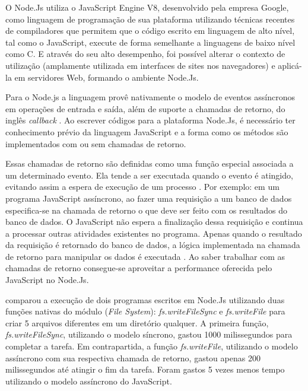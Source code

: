   O Node.Js utiliza o JavaScript Engine V8, desenvolvido pela empresa Google, como linguagem de programação
  de sua plataforma utilizando técnicas recentes de compiladores que permitem que o código escrito em linguagem de alto nível,
  tal como o JavaScript, execute de forma semelhante a linguagens de baixo nível como C.  E através do seu alto desempenho, 
  foi possível alterar o contexto de utilização (amplamente utilizada em interfaces de sites nos navegadores) e aplicá-la em 
  servidores Web, formando o ambiente Node.Js.
  
  
  Para o Node.js a linguagem provê nativamente o modelo de eventos assíncronos em operações de entrada e saída, 
  além de suporte a chamadas de retorno, do inglês \textit{callback} \cite{oliveira}.  Ao escrever códigos para a 
  plataforma Node.Js, é necessário ter conhecimento prévio da linguagem JavaScript e a forma como os 
  métodos são implementados com ou sem chamadas de retorno. \cite{hughes}
  
  
  
 

  Essas chamadas de retorno são definidas como uma função especial associada a um determinado evento. Ela tende a ser 
  executada quando o evento é atingido, evitando assim a espera de execução de um processo \cite{wilson}. Por exemplo:
  em um programa JavaScript assíncrono, ao fazer uma requisição a um banco de dados especifica-se na chamada de retorno o 
  que deve ser feito com os resultados do banco de dados. O JavaScript
  não espera a finalização dessa requisição e continua a processar outras atividades existentes no programa. 
  Apenas quando o resultado da requisição é retornado do banco de dados, a lógica implementada na chamada de retorno 
  para manipular os dados é executada \cite{junior}. Ao saber trabalhar com as chamadas de retorno consegue-se aproveitar 
  a performance oferecida pelo JavaScript no Node.Js.
  
   comparou a execução de dois programas escritos em Node.Js utilizando duas funções nativas
  do módulo (\textit{File System}): \textit{fs.writeFileSync} e \textit{fs.writeFile} para criar 5 arquivos diferentes 
  em um diretório qualquer. A primeira função, \textit{fs.writeFileSync}, utilizando o modelo síncrono, gastou 1000 milissegundos 
  para completar a tarefa. Em contrapartida, a função \textit{fs.writeFile}, utilizando o modelo assíncrono com sua respectiva 
  chamada de retorno, gastou apenas 200 milissegundos até atingir o fim da tarefa. Foram gastos 5 vezes menos tempo utilizando o 
  modelo assíncrono do JavaScript.
  

